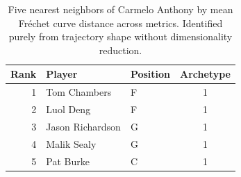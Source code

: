 \begin{table}[htbp]
  \centering\small
  \begin{tabular}{rllc}
    \toprule
    Rank & Player & Position & Archetype \\
    \midrule
    1 & Tom Chambers & F & 1 \\
    2 & Luol Deng & F & 1 \\
    3 & Jason Richardson & G & 1 \\
    4 & Malik Sealy & G & 1 \\
    5 & Pat Burke & C & 1 \\
    \bottomrule
  \end{tabular}
  \caption{Five nearest neighbors of Carmelo Anthony by mean Fr\'{e}chet curve distance across metrics. Identified purely from trajectory shape without dimensionality reduction.}
  \label{tab:Carmelo_Anthony_frechet_curve_neighbors}
\end{table}

